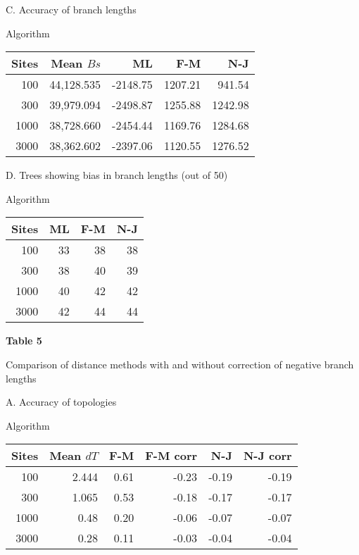 \begin{flushleft}

\bigskip

\begin{center}
C.  Accuracy of branch lengths

Algorithm

\begin{tabular}{| r | r | r r r |}
\hline
Sites & Mean $Bs$ & ML & F-M & N-J\\
\hline
100 & 44,128.535 & -2148.75 & 1207.21 & 941.54\\
300 & 39,979.094 & -2498.87 & 1255.88 & 1242.98\\
1000 & 38,728.660 & -2454.44 & 1169.76 & 1284.68\\
3000 & 38,362.602 & -2397.06 & 1120.55 & 1276.52\\
\hline
\end{tabular}

\bigskip
D. Trees showing bias in branch lengths (out of 50)

Algorithm

\begin{tabular}{| r | r r r |}
\hline
Sites  & ML & F-M & N-J\\
\hline
100  & 33 & 38 & 38\\
300  & 38 & 40 & 39\\
1000  & 40 & 42 & 42\\
3000  & 42 & 44 & 44\\
\hline
\end{tabular}
\end{center}

\newpage
\begin{flushleft}

{\bf Table 5

Comparison of distance methods with and without correction of negative
branch lengths}

\begin{center}
A.  Accuracy of topologies

Algorithm

\begin{tabular}{| r | r | r r r r |}
\hline
Sites & Mean $dT$ & F-M & F-M corr & N-J & N-J corr \\
\hline
100 & 2.444 & 0.61 & -0.23 & -0.19 & -0.19\\
300 & 1.065 & 0.53 & -0.18 & -0.17 & -0.17\\
1000 & 0.48 & 0.20 & -0.06 & -0.07 & -0.07\\
3000 & 0.28 & 0.11 & -0.03 & -0.04 & -0.04\\
\hline
\end{tabular}
\bigskip


\end{center}
\end{flushleft}
\end{flushleft}
